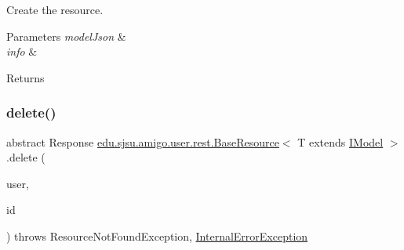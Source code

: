 Create the resource.


\begin{DoxyParams}{Parameters}
{\em model\+Json} & \\
\hline
{\em info} & \\
\hline
\end{DoxyParams}
\begin{DoxyReturn}{Returns}

\end{DoxyReturn}
\mbox{\label{classedu_1_1sjsu_1_1amigo_1_1user_1_1rest_1_1_base_resource_accf9c43ef36e1377d6082844799c0e25}} 
\subsubsection{\texorpdfstring{delete()}{delete()}}
{\footnotesize\ttfamily abstract Response \hyperlink{classedu_1_1sjsu_1_1amigo_1_1user_1_1rest_1_1_base_resource}{edu.\+sjsu.\+amigo.\+user.\+rest.\+Base\+Resource}$<$ T extends \hyperlink{interfaceedu_1_1sjsu_1_1amigo_1_1db_1_1common_1_1model_1_1_i_model}{I\+Model} $>$.delete (\begin{DoxyParamCaption}\item[{@Auth \hyperlink{classedu_1_1sjsu_1_1amigo_1_1user_1_1auth_1_1_principal_user}{Principal\+User}}]{user,  }\item[{@Path\+Param(\char`\"{}id\char`\"{}) String}]{id }\end{DoxyParamCaption}) throws Resource\+Not\+Found\+Exception, \hyperlink{classedu_1_1sjsu_1_1amigo_1_1user_1_1rest_1_1_internal_error_exception}{Internal\+Error\+Exception}\hspace{0.3cm}{\ttfamily [abstract]}}

\mbox{\label{classedu_1_1sjsu_1_1amigo_1_1user_1_1rest_1_1_base_resource_aa035eb9e4d83221d9ac9eb937660a063}} 
